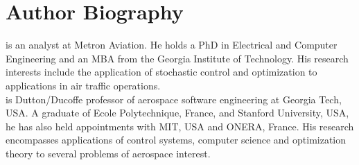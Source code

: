 \documentclass[letterpaper]{article}
\begin{document}
\section*{Author Biography}
 is an analyst at Metron Aviation. He holds a PhD in Electrical and Computer Engineering and an MBA from the Georgia Institute of Technology. His research interests include the application of stochastic control and optimization to applications in air traffic operations.\\

 is Dutton/Ducoffe professor of aerospace software engineering at Georgia Tech, USA. A graduate of Ecole Polytechnique, France, and Stanford University, USA, he has also held appointments with MIT, USA and ONERA, France. His research encompasses applications of control systems, computer science and optimization theory to several problems of aerospace interest.
\end{document}
